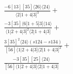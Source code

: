 \documentclass[varwidth, border=5pt]{standalone}
\begin{document}
\begin{my}
$\begin{gathered}
\scriptscriptstyle\frac{-6[13][35]⟨26⟩⟨24⟩}{⟨2|1+4|3]^3}+\\
\scriptscriptstyle\frac{-3[35]⟨6|1+5|3]⟨14⟩}{⟨1|2+4|3]^2⟨2|1+4|3]}+\\
\scriptscriptstyle\frac{3[35]^2⟨24⟩\scriptscriptstyle(s124-s134)}{[56]⟨1|2+4|3]⟨2|1+4|3]^2}+\\
\scriptscriptstyle\frac{-3[35][25]⟨24⟩}{[56]⟨1|2+4|3]⟨2|1+4|3]}\phantom{+}
\end{gathered}$
\end{my}
\end{document}
